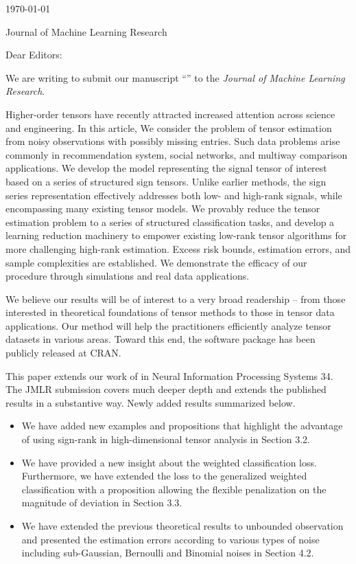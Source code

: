 \documentclass{article}
\begin{document}
\hfill{\today}

Journal of Machine Learning Research

\bigskip

Dear Editors:

We are writing to submit our manuscript ``'' to the \emph{Journal of Machine Learning Research}.

Higher-order tensors have recently attracted increased attention across science and engineering. In this article, We consider the problem of tensor estimation from noisy observations with possibly missing entries. Such data problems arise commonly in recommendation system, social networks, and multiway comparison applications. We develop the model representing the signal tensor of interest based on a series of structured sign tensors. Unlike earlier methods, the sign series representation effectively addresses both low- and high-rank signals, while encompassing many existing tensor models. We provably reduce the tensor estimation problem to a series of structured classification tasks, and  develop a learning reduction machinery to empower existing low-rank tensor algorithms for more challenging high-rank estimation. Excess risk bounds, estimation errors, and sample complexities are established.
We demonstrate the efficacy of our procedure through simulations and real data applications.

We believe our results will be of interest to a very broad readership -- from those interested in theoretical foundations of tensor methods to those in tensor data applications. Our method will help the practitioners efficiently analyze tensor datasets in various areas. Toward this end, the software package has been publicly released at CRAN.

This paper extends our work of  in Neural Information Processing Systems 34. The JMLR submission covers much deeper depth and extends the published results in a substantive way.  Newly added results summarized below.
\begin{itemize}
\item We have added new examples and propositions that highlight the advantage of using sign-rank in high-dimensional tensor analysis in Section 3.2.
\item We have provided a new insight about the weighted classification loss. Furthermore, we have extended the loss to the generalized weighted classification with a proposition allowing the flexible penalization on the magnitude of deviation in Section 3.3.
\item We have extended the previous theoretical results to unbounded observation and presented the estimation errors according to various types of noise including sub-Gaussian, Bernoulli and Binomial noises in Section 4.2.
\end{itemize}
\end{document}
